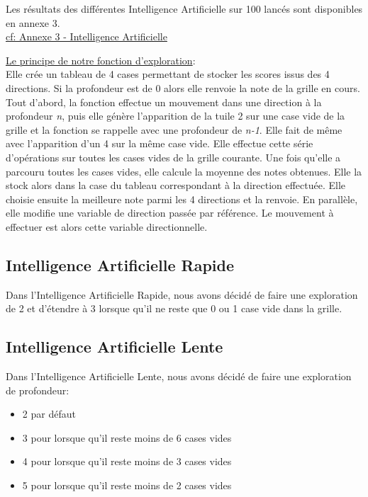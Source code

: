 \documentclass[a4paper]{article}
\begin{document}
 Les résultats des différentes Intelligence Artificielle sur 100 lancés sont disponibles en annexe 3.\\
 \hyperref[sec-7-3]{cf: Annexe 3 - Intelligence Artificielle}

 \vspace{0.2cm}
 \noindent
 \underline{Le principe de notre fonction d'exploration}:\\
 Elle crée un tableau de 4 cases permettant de stocker les scores issus
 des 4 directions. Si la profondeur est de 0 alors elle renvoie la note
 de la grille en cours. Tout d'abord, la fonction effectue un mouvement
 dans une direction à la profondeur \emph{n}, puis elle génère l'apparition de 
 la tuile 2 sur une case vide de la grille et la fonction se rappelle 
 avec une profondeur de \emph{n-1}. Elle fait de même avec l'apparition d'un 4 
 sur la même case vide. Elle effectue cette série d'opérations sur toutes 
 les cases vides de la grille courante. Une fois qu'elle a parcouru toutes 
 les cases vides, elle calcule la moyenne des notes obtenues. Elle la stock 
 alors dans la case du tableau correspondant à la direction effectuée. 
 Elle choisie ensuite la meilleure note parmi les 4 directions et la renvoie. 
 En parallèle, elle modifie une variable de direction passée par référence. 
 Le mouvement à effectuer est alors cette variable directionnelle.


 \subsection{Intelligence Artificielle Rapide}
 \label{sec-5-1}
 Dans l'Intelligence Artificielle Rapide, nous avons décidé de faire une 
 exploration de 2 et d'étendre à 3 lorsque qu'il ne reste que 0 ou 1 case 
 vide dans la grille.

 \noindent

 \subsection{Intelligence Artificielle Lente}
 \label{sec-5-2}
 Dans l'Intelligence Artificielle Lente, nous avons décidé de faire
 une exploration de profondeur:
 \begin{itemize}
 \item 2 par défaut
 \item 3 pour lorsque qu'il reste moins de 6 cases vides
 \item 4 pour lorsque qu'il reste moins de 3 cases vides
 \item 5 pour lorsque qu'il reste moins de 2 cases vides
 \end{itemize}
\end{document}
